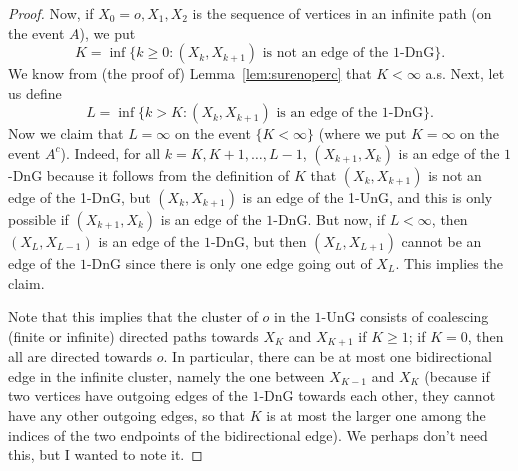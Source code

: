\documentclass{article}
\theoremstyle{definition}
\newcommand{\1}{\mathbbm{1}}
\newcommand{\0}{\mathbf{o}}
\begin{document}
\begin{proof}

Now, if $X_0=o,X_1,X_2$ is the sequence of vertices in an infinite path (on the event $A$), we put
\[ K=\inf \{ k \geq 0 \colon (X_k,X_{k+1}) \text{ is not an edge of the $1$-DnG} \}. \]
We know from (the proof of) Lemma~\ref{lem:surenoperc} that $K<\infty$ a.s. Next, let us define
\[ L=\inf \{ k > K \colon 
(X_{k},X_{k+1})\text{ is an edge of the 1-DnG}\}. \]
Now we claim that $L=\infty$ on the event $\{ K<\infty\}$ (where we put $K=\infty$ on the event $A^c$). Indeed, for all $k=K,K+1,\ldots,L-1$, $(X_{k+1},X_k)$ is an edge of the $1$-DnG because it follows from the definition of $K$ that $(X_{k},X_{k+1})$ is not an edge of the 1-DnG, but $(X_k,X_{k+1})$ is an edge of the 1-UnG, and this is only possible if $(X_{k+1},X_k)$ is an edge of the $1$-DnG. But now, if $L<\infty$, then $(X_{L},X_{L-1})$ is an edge of the $1$-DnG, but then $(X_{L},X_{L+1})$ cannot be an edge of the $1$-DnG since there is only one edge going out of $X_L$. This implies the claim.

\color{blue} Note that this implies that the cluster of $o$ in the $1$-UnG consists of coalescing (finite or infinite) directed paths towards $X_K$ and $X_{K+1}$ if $K\geq 1$; if $K=0$, then all are directed towards $o$. In particular, there can be at most one bidirectional edge in the infinite cluster, namely the one between $X_{K-1}$ and $X_K$ (because if two vertices have outgoing edges of the $1$-DnG towards each other, they cannot have any other outgoing edges, so that $K$ is at most the larger one among the indices of the two endpoints of the bidirectional edge). We perhaps don't need this, but I wanted to note it. \color{black}


\end{proof}
\end{document}
